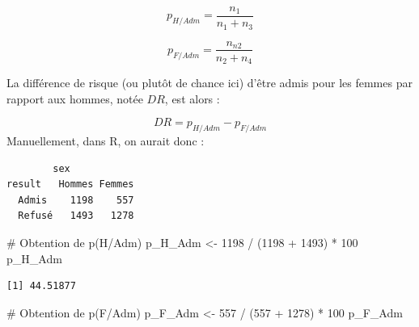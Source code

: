 \documentclass[
  letterpaper,
]{book}
\newenvironment{Shaded}{\begin{snugshade}}{\end{snugshade}}
\newcommand{\AttributeTok}[1]{\textcolor[rgb]{0.40,0.45,0.13}{#1}}
\newcommand{\CommentTok}[1]{\textcolor[rgb]{0.37,0.37,0.37}{#1}}
\newcommand{\DecValTok}[1]{\textcolor[rgb]{0.68,0.00,0.00}{#1}}
\newcommand{\FunctionTok}[1]{\textcolor[rgb]{0.28,0.35,0.67}{#1}}
\newcommand{\NormalTok}[1]{\textcolor[rgb]{0.00,0.23,0.31}{#1}}
\newcommand{\OtherTok}[1]{\textcolor[rgb]{0.00,0.23,0.31}{#1}}
\newcommand{\SpecialCharTok}[1]{\textcolor[rgb]{0.37,0.37,0.37}{#1}}
\newcommand{\StringTok}[1]{\textcolor[rgb]{0.13,0.47,0.30}{#1}}
\begin{document}
\[p_{H/Adm} = \frac{n_{1}}{n_{1} + n_{3}}\]

\[p_{F/Adm} = \frac{n_{n2}}{n_{2} + n_{4}}\]

La différence de risque (ou plutôt de chance ici) d'être admis pour les
femmes par rapport aux hommes, notée \(DR\), est alors :

\[DR = p_{H/Adm} - p_{F/Adm} \] Manuellement, dans R, on aurait donc :

\begin{Shaded}
\end{Shaded}

\begin{verbatim}
        sex
result   Hommes Femmes
  Admis    1198    557
  Refusé   1493   1278
\end{verbatim}

\begin{Shaded}
\begin{Highlighting}[]
\CommentTok{\# Obtention de p(H/Adm)}
\NormalTok{p\_H\_Adm }\OtherTok{\textless{}{-}} \DecValTok{1198} \SpecialCharTok{/}\NormalTok{ (}\DecValTok{1198} \SpecialCharTok{+} \DecValTok{1493}\NormalTok{) }\SpecialCharTok{*} \DecValTok{100}
\NormalTok{p\_H\_Adm}
\end{Highlighting}
\end{Shaded}

\begin{verbatim}
[1] 44.51877
\end{verbatim}

\begin{Shaded}
\begin{Highlighting}[]
\CommentTok{\# Obtention de p(F/Adm)}
\NormalTok{p\_F\_Adm }\OtherTok{\textless{}{-}} \DecValTok{557} \SpecialCharTok{/}\NormalTok{ (}\DecValTok{557} \SpecialCharTok{+} \DecValTok{1278}\NormalTok{) }\SpecialCharTok{*} \DecValTok{100}
\NormalTok{p\_F\_Adm}
\end{Highlighting}
\end{Shaded}
\end{document}
